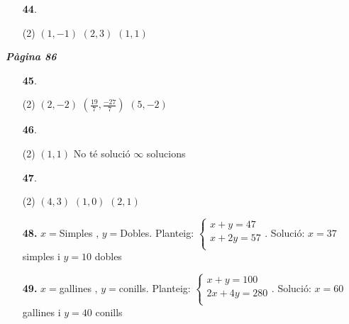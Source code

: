 \documentclass[a4paper, pdf, twoside]{book}
\begin{document}
\begin{multicols}{2}
\begin{enumerate}
 \item[\fontfamily{phv}\selectfont\color{blue}\textbf{44}. ] 
 \begin{tasks}[column-sep=1em, item-indent=1.3333em](2)
	 \task $(1,-1)$
	 \task $(2,3)$
	 \task $(1,1)$
\end{tasks}
 \end{enumerate}
\vspace{0.3cm}


{\textbf{\em Pàgina 86}} \hrulefill
\begin{enumerate}
\vspace{0.25cm}



 \item[\fontfamily{phv}\selectfont\color{blue}\textbf{45}. ] 
 \begin{tasks}[column-sep=1em, item-indent=1.3333em](2)
	 \task $(2,-2)$
	 \task* $(\frac {19}{7},\frac {-27}{7})$
	 \task $(5,-2)$
\end{tasks}
 \end{enumerate}
\begin{enumerate}
\vspace{0.25cm}



 \item[\fontfamily{phv}\selectfont\color{blue}\textbf{46}. ] 
 \begin{tasks}[column-sep=1em, item-indent=1.3333em](2)
	 \task $(1,1)$
	 \task No té solució
	 \task $\infty $ solucions
\end{tasks}
\vspace{0.25cm}



 \item[\fontfamily{phv}\selectfont\color{blue}\textbf{47}. ] 
 \begin{tasks}[column-sep=1em, item-indent=1.3333em](2)
	 \task $(4,3)$
	 \task $(1,0)$
	 \task $(2,1)$
\end{tasks}
\vspace{0.25cm}
\item[\fontfamily{phv}\selectfont\color{blue}\textbf{48. }] 
$x=$Simples , $y=$Dobles. Planteig: $\left \{\begin {array}{l} x+y = 47 \\ x+2y = 57 \\ \end {array} \right .$. Solució: $x=37$ simples i $y=10$ dobles
\vspace{0.25cm}
\item[\fontfamily{phv}\selectfont\color{blue}\textbf{49. }] 
$x=$gallines , $y=$conills. Planteig: $\left \{\begin {array}{l} x + y= 100 \\ 2x+4y=280 \\ \end {array} \right .$. Solució: $x=60$ gallines i $y=40$ conills
 \end{enumerate}
\vspace{0.3cm}


\end{multicols}
\end{document}
